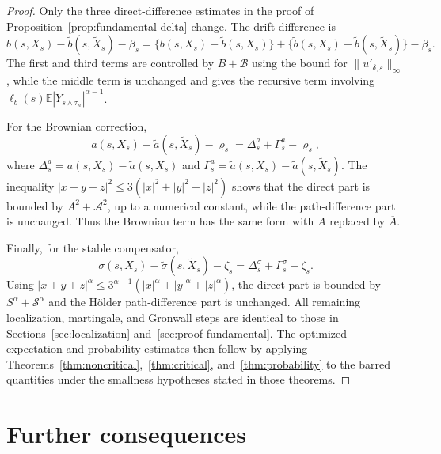 \documentclass[11pt]{article}
\newcommand{\E}{\mathbb{E}}
\newcommand{\1}{\mathbf{1}}
\newcommand{\wt}{\tilde}
\newcommand{\eps}{\varepsilon}
\begin{document}
\begin{proof}
Only the three direct-difference estimates in the proof of Proposition~\ref{prop:fundamental-delta} change. The drift difference is
\[
  b(s,X_s)-\wt b(s,\wt X_s)-\beta_s
  =\{b(s,X_s)-\wt b(s,X_s)\}
   +\{\wt b(s,X_s)-\wt b(s,\wt X_s)\}-\beta_s.
\]
The first and third terms are controlled by $B+\mathcal B$ using the bound for $\|u'_{\delta,\eps}\|_\infty$, while the middle term is unchanged and gives the recursive term involving $\ell_b(s)\E|Y_{s\wedge\tau_n}|^{\alpha-1}$.

For the Brownian correction,
\[
  a(s,X_s)-\wt a(s,\wt X_s)-\varrho_s
  =\Delta_s^a+\Gamma_s^a-\varrho_s,
\]
where $\Delta_s^a=a(s,X_s)-\wt a(s,X_s)$ and $\Gamma_s^a=\wt a(s,X_s)-\wt a(s,\wt X_s)$. The inequality $|x+y+z|^2\le3(|x|^2+|y|^2+|z|^2)$ shows that the direct part is bounded by $A^2+\mathcal A^2$, up to a numerical constant, while the path-difference part is unchanged. Thus the Brownian term has the same form with $A$ replaced by $\overline A$.

Finally, for the stable compensator,
\[
  \sigma(s,X_s)-\wt\sigma(s,\wt X_s)-\zeta_s
  =\Delta_s^\sigma+\Gamma_s^\sigma-\zeta_s.
\]
Using $|x+y+z|^\alpha\le 3^{\alpha-1}(|x|^\alpha+|y|^\alpha+|z|^\alpha)$, the direct part is bounded by $S^\alpha+\mathcal S^\alpha$ and the H\"older path-difference part is unchanged. All remaining localization, martingale, and Gronwall steps are identical to those in Sections~\ref{sec:localization} and~\ref{sec:proof-fundamental}. The optimized expectation and probability estimates then follow by applying Theorems~\ref{thm:noncritical},~\ref{thm:critical}, and~\ref{thm:probability} to the barred quantities under the smallness hypotheses stated in those theorems.
\end{proof}

\section{Further consequences}
\label{sec:consequences}
\end{document}

